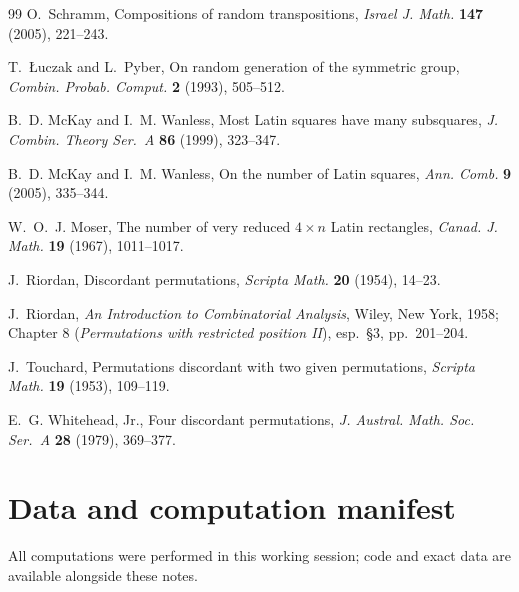 \documentclass[11pt]{article}
\theoremstyle{definition}
\begin{document}
\begin{thebibliography}{99}
 O.~Schramm, Compositions of random transpositions,
\emph{Israel J. Math.} \textbf{147} (2005), 221--243.

 T.~{\L}uczak and L.~Pyber, On random generation of the
symmetric group, \emph{Combin. Probab. Comput.} \textbf{2} (1993), 505--512.

 B.~D. McKay and I.~M. Wanless, Most Latin squares have many
subsquares, \emph{J. Combin. Theory Ser.~A} \textbf{86} (1999), 323--347.

 B.~D. McKay and I.~M. Wanless, On the number of Latin
squares, \emph{Ann. Comb.} \textbf{9} (2005), 335--344.

 W.~O.~J. Moser, The number of very reduced $4\times n$
Latin rectangles, \emph{Canad. J. Math.} \textbf{19} (1967), 1011--1017.

 J.~Riordan, Discordant permutations,
\emph{Scripta Math.} \textbf{20} (1954), 14--23.

 J.~Riordan, \emph{An Introduction to Combinatorial
Analysis}, Wiley, New York, 1958; Chapter 8 (\emph{Permutations with
restricted position II}), esp.\ \S3, pp.~201--204.

 J.~Touchard, Permutations discordant with two given
permutations, \emph{Scripta Math.} \textbf{19} (1953), 109--119.

 E.~G. Whitehead, Jr., Four discordant permutations,
\emph{J. Austral. Math. Soc. Ser.~A} \textbf{28} (1979), 369--377.

\end{thebibliography}

\appendix

\section{Data and computation manifest}\label{app:data}

All computations were performed in this working session; code and exact data
are available alongside these notes.
\end{document}
